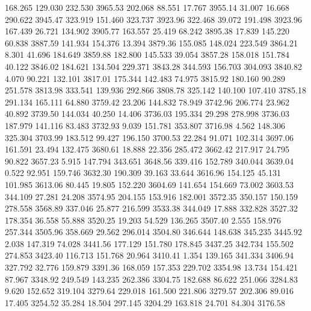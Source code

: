  168.265  129.030  232.530      3965.53
 202.068   88.551   17.767      3955.14
  31.007   16.668  290.622      3945.47
 323.919  151.460  323.737      3923.96
 322.468   39.072  191.498      3923.96
 167.439   26.721  134.902      3905.77
 163.557   25.419   68.242      3895.38
  17.839  145.220   60.838      3887.59
 141.934  154.376   13.394      3879.36
 155.085  148.024  223.549      3864.21
   8.301   41.696  184.649      3859.88
 182.800  145.533   39.054      3857.28
 158.018  151.784   40.122      3846.02
 184.621  134.504  229.371      3843.28
 344.593  156.703  304.093      3840.82
   4.070   90.221  132.101      3817.01
 175.344  142.483   74.975      3815.92
 180.160   90.289  251.578      3813.98
 333.541  139.936  292.866      3808.78
 325.142  140.100  107.410      3785.18
 291.134  165.111   64.880      3759.42
  23.206  144.832   78.949      3742.96
 206.774   23.962   40.892      3739.50
 144.034   40.250   14.406      3736.03
 195.334   29.298  278.998      3736.03
 187.979  141.116   83.483      3732.93
   9.039  151.781  353.807      3716.98
   4.562  148.306  325.304      3703.99
 183.512   99.427  196.150      3700.53
  22.284   91.071  102.314      3697.06
 161.591   23.494  132.475      3680.61
  18.888   22.356  285.472      3662.42
 217.917   24.795   90.822      3657.23
   5.915  147.794  343.651      3648.56
 339.416  152.789  340.044      3639.04
   0.522   92.951  159.746      3632.30
 190.309   39.163   33.644      3616.96
 154.125   45.131  101.985      3613.06
  80.445   19.805  152.220      3604.69
 141.654  154.669   73.002      3603.53
 344.109   27.281   24.208      3574.95
 204.155  153.916  182.001      3572.35
 350.157  150.159  278.558      3568.89
 337.046   25.877  216.599      3533.38
 344.049   17.888  332.828      3527.32
 178.354   36.558   55.888      3520.25
  19.203   54.529  136.265      3507.40
   2.555  158.976  257.344      3505.96
 358.669   29.562  296.014      3504.80
 346.644  148.638  345.235      3445.92
   2.038  147.319   74.028      3441.56
 177.129  151.780  178.845      3437.25
 342.734  155.502  274.853      3423.40
 116.713  151.768   20.964      3410.41
   1.354  139.165  341.334      3406.94
 327.792   32.776  159.879      3391.36
 168.059  157.353  229.702      3354.98
  13.734  154.421   87.967      3348.92
 249.549  143.235  262.386      3304.75
 182.688   86.622  251.066      3284.83
   9.620  152.652  319.104      3279.64
 229.018  161.500  221.806      3279.57
 202.306   89.016   17.405      3254.52
  35.284   18.504  297.145      3204.29
 163.818   24.701   84.304      3176.58
